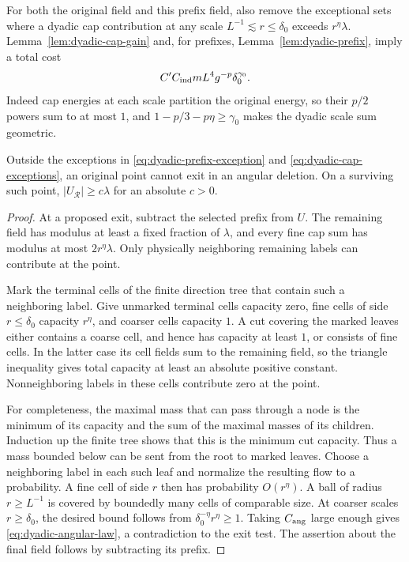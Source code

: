 For both the original field and this prefix field, also remove the
exceptional sets where a dyadic cap contribution at any scale
$L^{-1}\lesssim r\leq\delta_0$ exceeds $r^\eta\lambda$.
Lemma~\ref{lem:dyadic-cap-gain} and, for prefixes,
Lemma~\ref{lem:dyadic-prefix}, imply a total cost
\begin{equation}\label{eq:dyadic-cap-exceptions}
 C' C_{\rm ind}mL^4g^{-p}\delta_0^{\gamma_0}.
\end{equation}
Indeed cap energies at each scale partition the original energy, so
their $p/2$ powers sum to at most $1$, and
$1-p/3-p\eta\geq\gamma_0$ makes the dyadic scale sum geometric.

\begin{lemma}
\label{lem:dyadic-flow}
Outside the exceptions in \eqref{eq:dyadic-prefix-exception} and
\eqref{eq:dyadic-cap-exceptions}, an original point cannot exit in an
angular deletion.  On a surviving such point,
$|U_{\mathcal R}|\geq c\lambda$ for an absolute $c>0$.
\end{lemma}
\begin{proof}
At a proposed exit, subtract the selected prefix from $U$.  The
remaining field has modulus at least a fixed fraction of $\lambda$,
and every fine cap sum has modulus at most $2r^\eta\lambda$.
Only physically neighboring remaining labels can contribute at the
point.

Mark the terminal cells of the finite direction tree that contain such
a neighboring label.  Give unmarked terminal cells capacity zero,
fine cells of side $r\leq\delta_0$ capacity $r^\eta$, and coarser cells
capacity $1$.  A cut covering the marked leaves either contains a
coarse cell, and hence has capacity at least $1$, or consists of fine
cells.  In the latter case its cell fields sum to the remaining field,
so the triangle inequality gives total capacity at least an absolute
positive constant.  Nonneighboring labels in these cells contribute
zero at the point.

For completeness, the maximal mass that can pass through a node is
the minimum of its capacity and the sum of the maximal masses of its
children.  Induction up the finite tree shows that this is the minimum
cut capacity.  Thus a mass bounded below can be sent from the root to
marked leaves.  Choose a neighboring label in each such leaf and
normalize the resulting flow to a probability.  A fine cell of side $r$
then has probability $O(r^\eta)$.  A ball of radius $r\geq L^{-1}$ is
covered by boundedly many cells of comparable size.  At coarser scales
$r\geq\delta_0$, the desired bound follows from
$\delta_0^{-\eta}r^\eta\geq1$.  Taking $C_{\rm ang}$ large enough
gives \eqref{eq:dyadic-angular-law}, a contradiction to the exit test.
The assertion about the final field follows by subtracting its prefix.
\end{proof}

